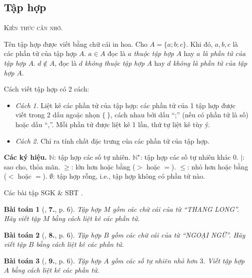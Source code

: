 \documentclass{article}
\numberwithin{equation}{section}
\newtheorem{baitoan}{Bài toán}[section]
\begin{document}
\subsection{Tập hợp}
\textsc{Kiến thức cần nhớ.}
\begin{tcolorbox}	
	Tên tập hợp được viết bằng chữ cái in hoa. Cho $A = \{a;b;c\}$. Khi đó, $a,b,c$ là các phần tử của tập hợp $A$. $a\in A$ đọc là \textit{$a$ thuộc tập hợp $A$} hay \textit{$a$ là phần tử của tập hợp $A$}. $d\notin A$, đọc là \textit{$d$ không thuộc tập hợp $A$} hay \textit{$d$ không là phần tử của tập hợp $A$}.
	
	Cách viết tập hợp có 2 cách:
	\begin{itemize}
		\item \textit{Cách 1.} Liệt kê các phần tử của tập hợp: các phần tử của 1 tập hợp được viết trong 2 dấu ngoặc nhọn $\{\ \}$, cách nhau bởi dấu ``;'' (nếu có phần tử là số) hoặc dấu ``,''. Mỗi phần tử được liệt kê 1 lần, thứ tự liệt kê tùy ý.
		\item \textit{Cách 2.} Chỉ ra tính chất đặc trưng của các phần tử của tập hợp.
	\end{itemize}
	\textbf{Các ký hiệu.} $\mathbb{N}$: tập hợp các số tự nhiên. $\mathbb{N}^\star$: tập hợp các số tự nhiên khác $0$. $|$: sao cho, thỏa mãn. $\ge$: lớn hơn hoặc bằng ($>$ hoặc $=$). $\le$: nhỏ hơn hoặc bằng ($<$ hoặc $=$). $\emptyset$: tập hợp rỗng, i.e., tập hợp không có phần tử nào.
\end{tcolorbox}
Các bài tập SGK \cite[\textbf{1}--\textbf{4}, pp. 7--8]{SGK_Toan_6_Canh_Dieu_tap_1} \& SBT \cite[Ví dụ 1, 2, p. 5; \textbf{1}--\textbf{8}, pp. 6--7]{SBT_Toan_6_Canh_Dieu_tap_1}.

\begin{baitoan}[\cite{Trong_Toan_6_2021}, \textbf{7.}, p. 6]
	Tập hợp $M$ gồm các chữ cái của từ ``THANG LONG''. Hãy viết tập $M$ bằng cách liệt kê các phần tử.
\end{baitoan}

\begin{baitoan}[\cite{Trong_Toan_6_2021}, \textbf{8.}, p. 6]
	Tập hợp $B$ gồm các chữ cái của từ ``NGOẠI NGỮ''. Hãy viết tập $B$ bằng cách liệt kê các phần tử.
\end{baitoan}

\begin{baitoan}[\cite{Trong_Toan_6_2021}, \textbf{9.}, p. 6]
	Tập hợp $A$ gồm các số tự nhiên nhỏ hơn $3$. Viết tập hợp $A$ bằng cách liệt kê các phần tử.
\end{baitoan}
\end{document}
